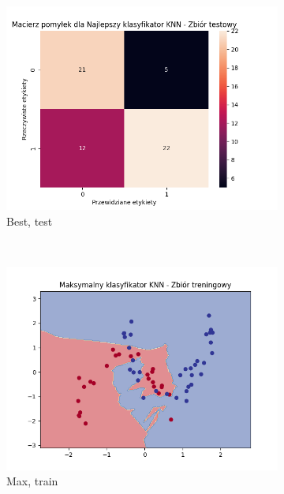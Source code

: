 \documentclass[12pt]{article}
\newcommand*{\subfigwidth}{0.24\textwidth}
\begin{document}
\begin{figure}[H]
\begin{subfigure}[t]{\subfigwidth}
        \includegraphics[width=\linewidth]{img/exp_3/knn/2_3/best/test_matrix.png}
        \caption{Best, test}
    \end{subfigure} 
    \\
    \begin{subfigure}[t]{\subfigwidth}
        \includegraphics[width=\linewidth]{img/exp_3/knn/2_3/max/train_boundary.png}
        \caption{Max, train}
    \end{subfigure}
    \hfill
    \begin{subfigure}[t]{\subfigwidth}

\end{subfigure}
\end{figure}
\end{document}
